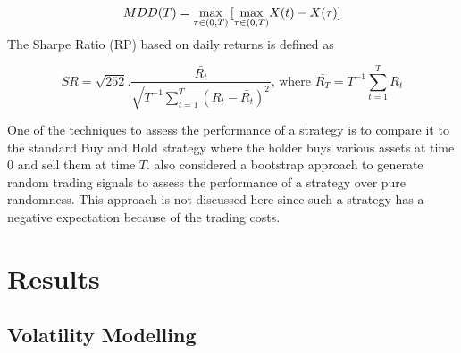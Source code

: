 \documentclass[11pt,a4,twosided,singlespacing,titlepagenumber=on]{scrreprt}
\numberwithin{equation}{chapter} %
\theoremstyle{remark}
\begin{document}
\begin{equation}
MDD(T) = \smash{\displaystyle\max_{\tau \in (0,T)}} \left[\smash{\displaystyle\max_{\tau \in (0,T)}} X(t) - X(\tau) \right] 
\end{equation}

The Sharpe Ratio (RP) based on daily returns is defined as

\begin{equation}
SR =  \sqrt{252 }  . \frac{\bar{R_t}}{\sqrt{T^{-1} \sum_{t=1}^T (R_t - \bar{R_t})^2 }} \text{, where } \bar{R_T} = T^{-1} \sum_{t=1}^T R_t 
\end{equation}

One of the techniques to assess the performance of a strategy is to compare it to the standard Buy and Hold strategy where the holder buys various assets at time $0$ and sell them at time $T$. \cite{gatev2006} also considered a bootstrap approach to generate random trading signals to assess the performance of a strategy over pure randomness. This approach is not discussed here since such a strategy has a negative expectation because of the trading costs.

\chapter{Results}
\section{Volatility Modelling}
\end{document}
